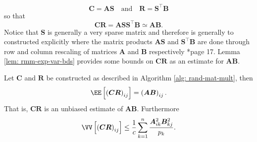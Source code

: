 \begin{equation*}
    \bm{C} = \bm{A} \bm{S} \quad \text{and} \quad \bm{R} = \bm{S}^{\intercal} \bm{B}
\end{equation*}
so that
\begin{equation} \label{eq: nys-sketch-apprx}
    \bm{C} \bm{R} = \bm{A} \bm{S} \bm{S}^{\intercal} \bm{B} \simeq \bm{A} \bm{B}.
\end{equation}
Notice that $\bm{S}$ is generally a very sparse matrix and therefore is generally to constructed explicitly where the matrix products $\bm{A} \bm{S}$ and $\bm{S}^{\intercal} \bm{B}$ are done through row and column rescaling of matrices $\bm{A}$ and $\bm{B}$ respectively \cite{drineas2017lectures}*{page 17}. Lemma \ref{lem: rmm-exp-var-bds} provides some bounds on $\bm{C} \bm{R}$ as an estimate for $\bm{A}\bm{B}$.

\begin{lem} \label{lem: rmm-exp-var-bds}
    Let $\bm{C}$ and $\bm{R}$ be constructed as described in Algorithm \ref{alg: rand-mat-mult}, then
    \[
        \EE \left[ \left( \bm{C} \bm{R} \right)_{ij} \right] = \left( \bm{A}\bm{B} \right)_{ij}.
    \]
    That is, $\bm{C} \bm{R}$ is an unbiased estimate of $\bm{A}\bm{B}$. Furthermore
    \[
        \VV \left[ \left( \bm{C} \bm{R} \right)_{ij} \right] \leq \frac{1}{c} \sum_{k=1}^{n} \frac{\bm{A}_{ik}^2 \bm{B}_{kj}^2}{p_k}.
    \]
\end{lem}

